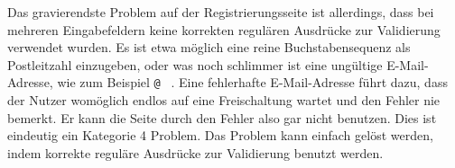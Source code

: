 { Das gravierendste Problem auf der Registrierungsseite ist allerdings, dass bei mehreren Eingabefeldern keine korrekten regulären Ausdrücke zur Validierung verwendet wurden. Es ist etwa möglich eine reine Buchstabensequenz als Postleitzahl einzugeben, oder was noch schlimmer ist eine ungültige E-Mail-Adresse, wie zum Beispiel \glqq \texttt{@} \grqq ~.
}
{ Eine fehlerhafte E-Mail-Adresse führt dazu, dass der Nutzer womöglich endlos auf eine Freischaltung wartet und den Fehler nie bemerkt. Er kann die Seite durch den Fehler also gar nicht benutzen. Dies ist eindeutig ein Kategorie 4 Problem.}
{ Das Problem kann einfach gelöst werden, indem korrekte reguläre Ausdrücke zur Validierung benutzt werden.
} 


